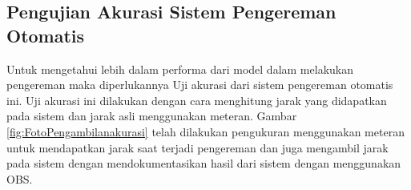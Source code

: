 

\subsection{Pengujian Akurasi Sistem Pengereman Otomatis}
Untuk mengetahui lebih dalam performa dari model dalam melakukan pengereman maka diperlukannya Uji akurasi dari sistem pengereman otomatis ini. Uji akurasi ini dilakukan dengan cara menghitung jarak yang didapatkan pada sistem dan jarak asli menggunakan meteran. Gambar \ref{fig:FotoPengambilanakurasi} telah dilakukan pengukuran menggunakan meteran untuk mendapatkan jarak saat terjadi pengereman dan juga mengambil jarak pada sistem dengan mendokumentasikan hasil dari sistem dengan menggunakan OBS.

